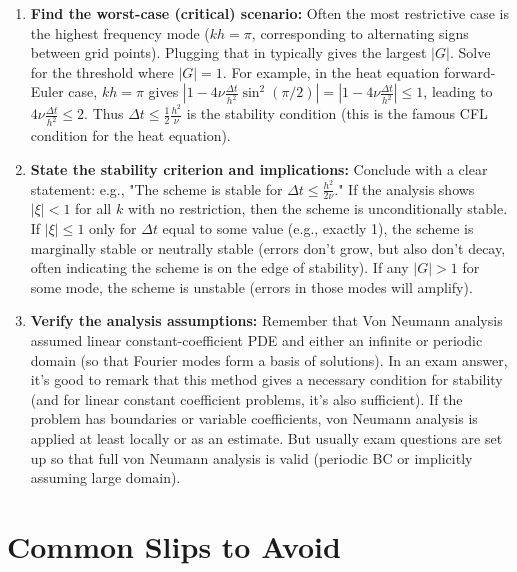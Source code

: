 \documentclass[a4paper,11pt]{report}
\begin{document}
\begin{enumerate}
    \item \textbf{Find the worst-case (critical) scenario:} Often the most restrictive case is the highest frequency mode ($kh = \pi$, corresponding to alternating signs between grid points). Plugging that in typically gives the largest $|G|$. Solve for the threshold where $|G|=1$. For example, in the heat equation forward-Euler case, $kh = \pi$ gives $|1 - 4\nu \frac{\Delta t}{h^2}\sin^2(\pi/2)| = |1 - 4\nu \frac{\Delta t}{h^2}| \le 1$, leading to $4\nu \frac{\Delta t}{h^2} \le 2$. Thus $\Delta t \le \frac{1}{2}\frac{h^2}{\nu}$ is the stability condition (this is the famous CFL condition for the heat equation).

    \item \textbf{State the stability criterion and implications:} Conclude with a clear statement: e.g., "The scheme is stable for $\displaystyle \Delta t \le \frac{h^2}{2\nu}$." If the analysis shows $|\xi| < 1$ for all $k$ with no restriction, then the scheme is unconditionally stable. If $|\xi|\le 1$ only for $\Delta t$ equal to some value (e.g., exactly 1), the scheme is marginally stable or neutrally stable (errors don't grow, but also don't decay, often indicating the scheme is on the edge of stability). If any $|G|>1$ for some mode, the scheme is unstable (errors in those modes will amplify).

    \item \textbf{Verify the analysis assumptions:} Remember that Von Neumann analysis assumed linear constant-coefficient PDE and either an infinite or periodic domain (so that Fourier modes form a basis of solutions). In an exam answer, it's good to remark that this method gives a necessary condition for stability (and for linear constant coefficient problems, it's also sufficient). If the problem has boundaries or variable coefficients, von Neumann analysis is applied at least locally or as an estimate. But usually exam questions are set up so that full von Neumann analysis is valid (periodic BC or implicitly assuming large domain).
\end{enumerate}

\section{Common Slips to Avoid}
\end{document}
